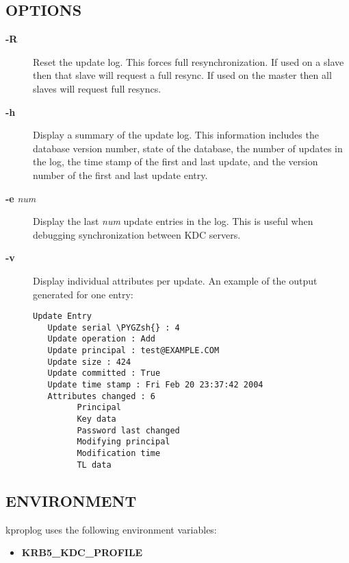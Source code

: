 \documentclass[letterpaper,10pt,english]{sphinxmanual}
\def\PYGZsh{\char`\#}
\begin{document}
\subsection{OPTIONS}
\label{admin/admin_commands/kproplog:options}\begin{description}
\item[{\textbf{-R}}] \leavevmode
Reset the update log.  This forces full resynchronization.  If used
on a slave then that slave will request a full resync.  If used on
the master then all slaves will request full resyncs.

\item[{\textbf{-h}}] \leavevmode
Display a summary of the update log.  This information includes
the database version number, state of the database, the number of
updates in the log, the time stamp of the first and last update,
and the version number of the first and last update entry.

\item[{\textbf{-e} \emph{num}}] \leavevmode
Display the last \emph{num} update entries in the log.  This is useful
when debugging synchronization between KDC servers.

\item[{\textbf{-v}}] \leavevmode
Display individual attributes per update.  An example of the
output generated for one entry:

\begin{Verbatim}[commandchars=\\\{\}]
Update Entry
   Update serial \PYGZsh{} : 4
   Update operation : Add
   Update principal : test@EXAMPLE.COM
   Update size : 424
   Update committed : True
   Update time stamp : Fri Feb 20 23:37:42 2004
   Attributes changed : 6
         Principal
         Key data
         Password last changed
         Modifying principal
         Modification time
         TL data
\end{Verbatim}

\end{description}


\subsection{ENVIRONMENT}
\label{admin/admin_commands/kproplog:environment}
kproplog uses the following environment variables:
\begin{itemize}
\item {} 
\textbf{KRB5\_KDC\_PROFILE}

\end{itemize}
\end{document}
